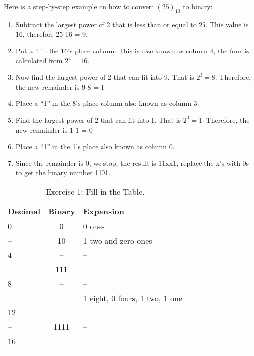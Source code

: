 \documentclass[twocolumn, 10pt]{article}
\begin{document}
Here is a step-by-step example on how to convert $(25)_{10}$ to binary:

\begin{enumerate}
  \item Subtract the largest power of 2 that is less than or equal to 25. This value is 16, therefore 25-16 = 9.
  \item Put a 1 in the 16’s place column. This is also known as column 4, the four is calculated from $2^4 = 16$. 
  \item Now find the largest power of 2 that can fit into 9. That is $2^3 = 8$. Therefore, the new remainder is 9-8 = 1
  \item Place a “1” in the 8’s place column also known as column 3. 
  \item Find the largest power of 2 that can fit into 1. That is $2^0 = 1$. Therefore, the new remainder is 1-1 = 0
  \item Place a “1” in the 1’s place also known as column 0. 
  \item Since the remainder is 0, we stop, the result is 11xx1, replace the x’s with 0s to get the binary number 1101. 
\end{enumerate}



\begin{table}[ht]
\centering
\caption{Exercise 1: Fill in the Table.}
\begin{tabular}[t]{lcl}
\hline
Decimal&Binary&Expansion\\
\hline
0 &0&0 ones\\
-- &10&1 two and zero ones\\
4 &--&--\\
-- &111&--\\
8 &--&--\\
-- &--&1 eight, 0 fours, 1 two, 1 one\\
12 &--&--\\
-- &1111&--\\
16 &--&--\\

\hline
\label{table: ex}
\end{tabular}
\end{table}%
\end{document}
